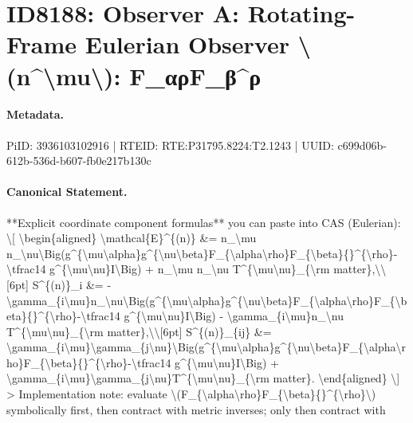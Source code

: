 \section*{ID8188: Observer A: Rotating-Frame Eulerian Observer \textbackslash{}(n\textasciicircum{}\textbackslash{}mu\textbackslash{}): F\_αρF\_β\textasciicircum{}ρ}
\paragraph{Metadata.}
PiID: 3936103102916 | RTEID: RTE:P31795.8224:T2.1243 | UUID: c699d06b-612b-536d-b607-fb0e217b130c

\paragraph{Canonical Statement.}
**Explicit coordinate component formulas** you can paste into CAS (Eulerian): \textbackslash{}[ \textbackslash{}begin\{aligned\} \textbackslash{}mathcal\{E\}\textasciicircum{}\{(n)\} \&= n\_\textbackslash{}mu n\_\textbackslash{}nu\textbackslash{}Big(g\textasciicircum{}\{\textbackslash{}mu\textbackslash{}alpha\}g\textasciicircum{}\{\textbackslash{}nu\textbackslash{}beta\}F\_\{\textbackslash{}alpha\textbackslash{}rho\}F\_\{\textbackslash{}beta\}\{\}\textasciicircum{}\{\textbackslash{}rho\}-\textbackslash{}tfrac14 g\textasciicircum{}\{\textbackslash{}mu\textbackslash{}nu\}I\textbackslash{}Big) + n\_\textbackslash{}mu n\_\textbackslash{}nu T\textasciicircum{}\{\textbackslash{}mu\textbackslash{}nu\}\_\{\textbackslash{}rm matter\},\textbackslash{}\textbackslash{}[6pt] S\textasciicircum{}\{(n)\}\_i \&= -\textbackslash{}gamma\_\{i\textbackslash{}mu\}n\_\textbackslash{}nu\textbackslash{}Big(g\textasciicircum{}\{\textbackslash{}mu\textbackslash{}alpha\}g\textasciicircum{}\{\textbackslash{}nu\textbackslash{}beta\}F\_\{\textbackslash{}alpha\textbackslash{}rho\}F\_\{\textbackslash{}beta\}\{\}\textasciicircum{}\{\textbackslash{}rho\}-\textbackslash{}tfrac14 g\textasciicircum{}\{\textbackslash{}mu\textbackslash{}nu\}I\textbackslash{}Big) - \textbackslash{}gamma\_\{i\textbackslash{}mu\}n\_\textbackslash{}nu T\textasciicircum{}\{\textbackslash{}mu\textbackslash{}nu\}\_\{\textbackslash{}rm matter\},\textbackslash{}\textbackslash{}[6pt] S\textasciicircum{}\{(n)\}\_\{ij\} \&= \textbackslash{}gamma\_\{i\textbackslash{}mu\}\textbackslash{}gamma\_\{j\textbackslash{}nu\}\textbackslash{}Big(g\textasciicircum{}\{\textbackslash{}mu\textbackslash{}alpha\}g\textasciicircum{}\{\textbackslash{}nu\textbackslash{}beta\}F\_\{\textbackslash{}alpha\textbackslash{}rho\}F\_\{\textbackslash{}beta\}\{\}\textasciicircum{}\{\textbackslash{}rho\}-\textbackslash{}tfrac14 g\textasciicircum{}\{\textbackslash{}mu\textbackslash{}nu\}I\textbackslash{}Big) + \textbackslash{}gamma\_\{i\textbackslash{}mu\}\textbackslash{}gamma\_\{j\textbackslash{}nu\}T\textasciicircum{}\{\textbackslash{}mu\textbackslash{}nu\}\_\{\textbackslash{}rm matter\}. \textbackslash{}end\{aligned\} \textbackslash{}] > Implementation note: evaluate \textbackslash{}(F\_\{\textbackslash{}alpha\textbackslash{}rho\}F\_\{\textbackslash{}beta\}\{\}\textasciicircum{}\{\textbackslash{}rho\}\textbackslash{}) symbolically first, then contract with metric inverses; only then contract with 